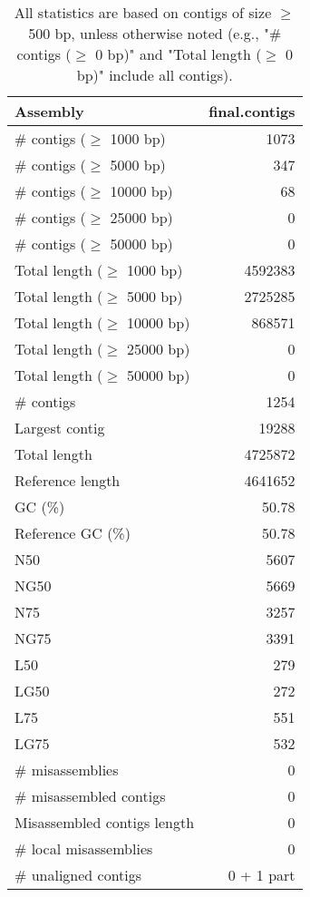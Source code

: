 \documentclass[12pt,a4paper]{article}
\begin{document}
\begin{table}[ht]
\begin{center}
\caption{All statistics are based on contigs of size $\geq$ 500 bp, unless otherwise noted (e.g., "\# contigs ($\geq$ 0 bp)" and "Total length ($\geq$ 0 bp)" include all contigs).}
\begin{tabular}{|l*{1}{|r}|}
\hline
Assembly & final.contigs \\ \hline
\# contigs ($\geq$ 1000 bp) & 1073 \\ \hline
\# contigs ($\geq$ 5000 bp) & 347 \\ \hline
\# contigs ($\geq$ 10000 bp) & 68 \\ \hline
\# contigs ($\geq$ 25000 bp) & 0 \\ \hline
\# contigs ($\geq$ 50000 bp) & 0 \\ \hline
Total length ($\geq$ 1000 bp) & 4592383 \\ \hline
Total length ($\geq$ 5000 bp) & 2725285 \\ \hline
Total length ($\geq$ 10000 bp) & 868571 \\ \hline
Total length ($\geq$ 25000 bp) & 0 \\ \hline
Total length ($\geq$ 50000 bp) & 0 \\ \hline
\# contigs & 1254 \\ \hline
Largest contig & 19288 \\ \hline
Total length & 4725872 \\ \hline
Reference length & 4641652 \\ \hline
GC (\%) & 50.78 \\ \hline
Reference GC (\%) & 50.78 \\ \hline
N50 & 5607 \\ \hline
NG50 & 5669 \\ \hline
N75 & 3257 \\ \hline
NG75 & 3391 \\ \hline
L50 & 279 \\ \hline
LG50 & 272 \\ \hline
L75 & 551 \\ \hline
LG75 & 532 \\ \hline
\# misassemblies & 0 \\ \hline
\# misassembled contigs & 0 \\ \hline
Misassembled contigs length & 0 \\ \hline
\# local misassemblies & 0 \\ \hline
\# unaligned contigs & 0 + 1 part \\ \hline

\end{tabular}
\end{center}
\end{table}
\end{document}

